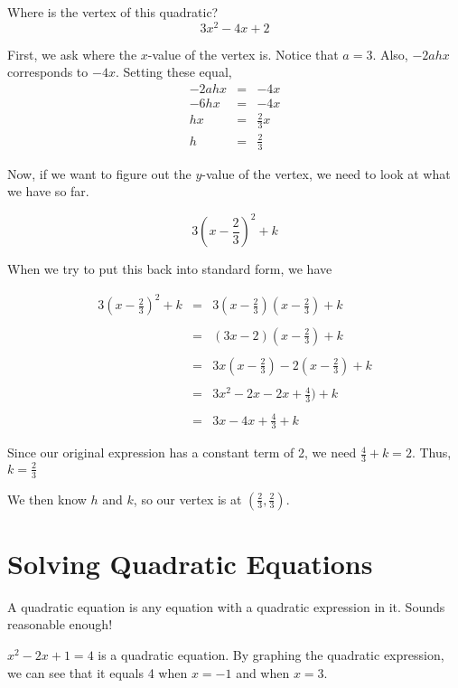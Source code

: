 \begin{example}
Where is the vertex of this quadratic?
$$3x^2 - 4x + 2$$

First, we ask where the $x$-value of the vertex is.  Notice that $a = 3$.  Also, $-2ahx$ corresponds to $-4x$.  Setting these equal,
$$\begin{array}{rcl}
-2ahx & = & -4x \\
-6hx & = &-4x \\
hx & = & \frac{2}{3}x \\
h & = & \frac{2}{3}
\end{array}$$

Now, if we want to figure out the $y$-value of the vertex, we need to look at what we have so far.

$$3(x - \frac{2}{3})^2 + k$$

When we try to put this back into standard form, we have

$$\begin{array}{rcl}
3(x - \frac{2}{3})^2 + k & = & 3(x - \frac{2}{3})(x - \frac{2}{3})+ k\\& & \\
& = & (3x - 2)(x - \frac{2}{3}) + k\\& & \\
& = & 3x(x - \frac{2}{3}) - 2(x - \frac{2}{3}) + k \\& & \\
& = & 3x^2 - 2x - 2x + \frac{4}{3}) + k \\ & & \\
& = & 3x - 4x + \frac{4}{3} + k
\end{array}$$

Since our original expression has a constant term of 2, we need $\frac{4}{3} + k = 2$.  Thus, $k = \frac{2}{3}$

We then know $h$ and $k$, so our vertex is at $(\frac{2}{3}, \frac{2}{3})$.

\end{example}

\section*{Solving Quadratic Equations}

A quadratic equation is any equation with a quadratic expression in it.  Sounds reasonable enough!

\begin{example}
$x^2 - 2x + 1 = 4$ is a quadratic equation.  By graphing the quadratic expression, we can see that it equals 4 when $x = -1$ and when $x = 3$.
\end{example}

